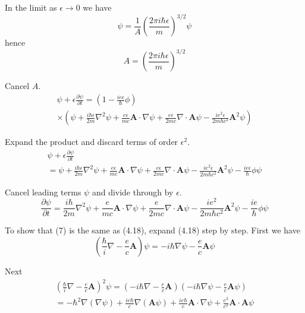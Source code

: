 \documentclass[12pt]{article}
\begin{document}
In the limit as $\epsilon\rightarrow0$ we have
\begin{equation*}
\psi=\frac{1}{A}\left(\frac{2\pi i\hbar\epsilon}{m}\right)^{3/2}\psi
\end{equation*}
hence
\begin{equation*}
A=\left(\frac{2\pi i\hbar\epsilon}{m}\right)^{3/2}
\end{equation*}

Cancel $A$.
\begin{multline*}
\psi+\epsilon\frac{\partial\psi}{\partial t}
=\left(1-\frac{ie\epsilon}{\hbar}\phi\right)
\\
\times\left(
\psi
+\frac{i\hbar\epsilon}{2m}\nabla^2\psi
+\frac{e\epsilon}{mc}\mathbf A\cdot\nabla\psi
+\frac{e\epsilon}{2mc}\nabla\cdot\mathbf A\psi
-\frac{ie^2\epsilon}{2m\hbar c^2}\mathbf A^2\psi
\right)
\end{multline*}

Expand the product and discard terms of order $\epsilon^2$.
\begin{multline*}
\psi+\epsilon\frac{\partial\psi}{\partial t}
\\
=\psi
+\frac{i\hbar\epsilon}{2m}\nabla^2\psi
+\frac{e\epsilon}{mc}\mathbf A\cdot\nabla\psi
+\frac{e\epsilon}{2mc}\nabla\cdot\mathbf A\psi
-\frac{ie^2\epsilon}{2m\hbar c^2}\mathbf A^2\psi
-\frac{ie\epsilon}{\hbar}\phi\psi
\end{multline*}

Cancel leading terms $\psi$ and divide through by $\epsilon$.
\begin{equation*}
\frac{\partial\psi}{\partial t}
=\frac{i\hbar}{2m}\nabla^2\psi
+\frac{e}{mc}\mathbf A\cdot\nabla\psi
+\frac{e}{2mc}\nabla\cdot\mathbf A\psi
-\frac{ie^2}{2m\hbar c^2}\mathbf A^2\psi
-\frac{ie}{\hbar}\phi\psi
\tag{7}
\end{equation*}

To show that (7) is the same as (4.18), expand (4.18) step by step.
First we have
\begin{equation*}
\left(\frac{\hbar}{i}\nabla-\frac{e}{c}\mathbf A\right)\psi
=-i\hbar\nabla\psi-\frac{e}{c}\mathbf A\psi
\end{equation*}

Next
\begin{multline*}
\left(\frac{\hbar}{i}\nabla-\frac{e}{c}\mathbf A\right)^2\psi
=\left(-i\hbar\nabla-\frac{e}{c}\mathbf A\right)
\left(-i\hbar\nabla\psi-\frac{e}{c}\mathbf A\psi\right)
\\
=-\hbar^2\nabla(\nabla\psi)
+\frac{ie\hbar}{c}\nabla(\mathbf A\psi)
+\frac{ie\hbar}{c}\mathbf A\cdot\nabla\psi
+\frac{e^2}{c^2}\mathbf A\cdot\mathbf A\psi
\end{multline*}
\end{document}
